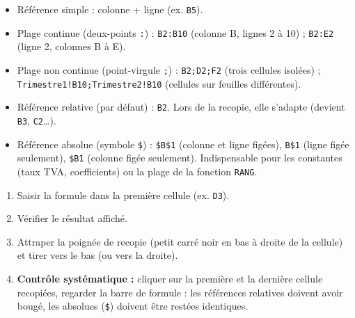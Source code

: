 \documentclass[11pt]{article}
\newcommand{\cle}[1]{{\popxbold\color{popdark}#1}}
\begin{document}
\begin{propriete}
\begin{itemize}
\item \cle{Référence simple} : colonne + ligne (ex. \texttt{B5}).
\item \cle{Plage continue (deux-points \texttt{:})} : \texttt{B2:B10} (colonne B, lignes 2 à 10) ; \texttt{B2:E2} (ligne 2, colonnes B à E).
\item \cle{Plage non continue (point-virgule \texttt{;})} : \texttt{B2;D2;F2} (trois cellules isolées) ; \texttt{Trimestre1!B10;Trimestre2!B10} (cellules sur feuilles différentes).
\item \cle{Référence relative} (par défaut) : \texttt{B2}. Lors de la recopie, elle s'adapte (devient \texttt{B3}, \texttt{C2}\ldots).
\item \cle{Référence absolue} (symbole \texttt{\$}) : \texttt{\$B\$1} (colonne et ligne figées), \texttt{B\$1} (ligne figée seulement), \texttt{\$B1} (colonne figée seulement). Indispensable pour les constantes (taux TVA, coefficients) ou la plage de la fonction \texttt{RANG}.
\end{itemize}
\end{propriete}

\begin{methode}
\begin{enumerate}
\item Saisir la formule dans la première cellule (ex. \texttt{D3}).
\item Vérifier le résultat affiché.
\item Attraper la \cle{poignée de recopie} (petit carré noir en bas à droite de la cellule) et tirer vers le bas (ou vers la droite).
\item \textbf{Contrôle systématique :} cliquer sur la première et la dernière cellule recopiées, regarder la barre de formule : les références relatives doivent avoir bougé, les absolues (\texttt{\$}) doivent être restées identiques.
\end{enumerate}
\end{methode}
\end{document}
